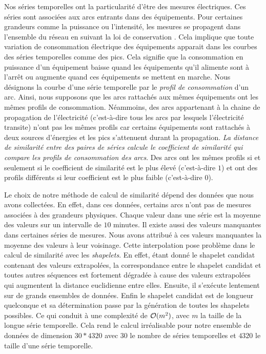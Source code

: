 Nos s\'eries temporelles ont la particularit\'e d'\^etre des mesures \'electriques. Ces s\'eries sont associ\'ees aux arcs entrants dans des \'equipements. Pour certaines grandeurs comme la puissance ou l'intensit\'e, les mesures se propagent dans l'ensemble du r\'eseau en suivant la loi de conservation \cite{loiDeConservation}. 
Cela implique que toute variation de consommation \'electrique des \'equipements apparait dans les courbes des s\'eries temporelles comme des pics. Cela signifie que la consommation en puissance d'un \'equipement
 baisse quand les \'equipements qu'il alimente sont \`a l'arr\^et ou 
 augmente quand ces \'equipements se mettent en marche.
Nous d\'esignons la courbe d'une s\'erie temporelle par le {\em profil de consommation} d'un arc. 
Ainsi, nous supposons que les arcs rattach\'es aux m\^emes \'equipements ont les m\^emes profils de consommation.
N\'eammoins, des arcs appartenant \`a la chaine de propagation de l'\'electricit\'e (c'est-\`a-dire tous les arcs par lesquels l'\'electricit\'e transite) n'ont pas les m\^emes profils car certains \'equipements sont rattach\'es \`a deux sources d'\'energies et les pics s'attenuent durant la propagation.
{\em La distance de similarit\'e entre des paires de s\'eries calcule le coefficient de similarit\'e qui compare les profils de consommation des arcs}. Des arcs ont les m\^emes profils  si et seulement si le coefficient de similarit\'e est le plus \'elev\'e (c'est-\`a-dire $1$) et ont des profils diff\'erents si  leur coefficient est le plus faible (c'est-\`a-dire $0$).
\newline

Le choix de notre m\'ethode de calcul de similarit\'e d\'epend des donn\'ees que nous avons collect\'ees. En effet, dans ces donn\'ees, certains arcs n'ont pas de mesures associ\'ees \`a des grandeurs physiques. Chaque valeur dans une s\'erie est la moyenne des valeurs sur un intervalle de $10$ minutes. 
Il existe aussi des valeurs manquantes dans certaines s\'eries de mesures. Nous avons attribu\'e \`a ces valeurs manquantes la moyenne des valeurs \`a leur voisinage. Cette interpolation pose probl\`eme dans le calcul de similarit\'e avec les {\em shapelets}.
 En effet, \'etant donn\'e le shapelet candidat contenant des valeurs extrapol\'ees, la correspondance entre le shapelet candidat et toutes autres s\'equences est fortement d\'egrad\'ee \`a cause des valeurs extrapol\'ees qui augmentent la distance euclidienne entre elles. Ensuite, il s'ex\'ecute lentement sur de grands ensembles de donn\'ees. Enfin le shapelet candidat est de longueur quelconque et sa d\'etermination passe par la g\'en\'eration de toutes les shapelets possibles. 
 Ce qui conduit \`a une complexit\'e de ${\cal O}(m^2)$, avec $m$ la taille de la longue s\'erie temporelle. 
 Cela rend le calcul irr\'ealisable pour notre ensemble de donn\'ees de dimension $30 * 4320$ avec $30$ le nombre de s\'eries temporelles et $4320$ le taille d'une s\'erie temporelle.
\newline

